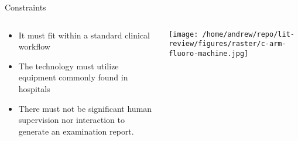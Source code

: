 \documentclass[aspectratio=1610]{beamer}
\begin{document}
\begin{frame}[label={sec:orgfdf0b80}]{Constraints}
\begin{columns}
\begin{column}{0.45\columnwidth}
\begin{itemize}
\item It must fit within a standard clinical workflow
\item The technology must utilize equipment commonly found in hospitals
\item There must not be significant human supervision nor interaction to generate an examination report.
\end{itemize}
\end{column}
\begin{column}{0.55\columnwidth}
\begin{center}
\texttt{[image: /home/andrew/repo/lit-review/figures/raster/c-arm-fluoro-machine.jpg]}
\end{center}
\end{column}
\end{columns}
\end{frame}
\end{document}
